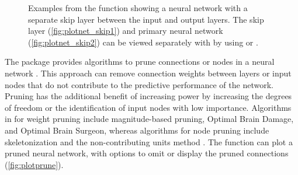 \documentclass[article,shortnames]{jss}
\begin{document}
\begin{figure}[!ht]
\caption{Examples from the  function showing a neural network with a separate skip layer between the input and output layers.  The skip layer (\ref{fig:plotnet_skip1}) and primary neural network (\ref{fig:plotnet_skip2}) can be viewed separately with  by using  or .}
\label{fig:plotnet_skip}
\end{figure}

The  package provides algorithms to prune connections or nodes in a neural network \citep{Bergmeir12}.  This approach can remove connection weights between layers or input nodes that do not contribute to the predictive performance of the network.  Pruning has the additional benefit of increasing power by increasing the degrees of freedom or the identification of input nodes with low importance.  Algorithms in  for weight pruning include magnitude-based pruning, Optimal Brain Damage, and Optimal Brain Surgeon, whereas algorithms for node pruning include skeletonization and the non-contributing units method \citep{Zell98}.  The  function can plot a pruned neural network, with options to omit or display the pruned connections (\cref{fig:plotprune}).  
\end{document}
